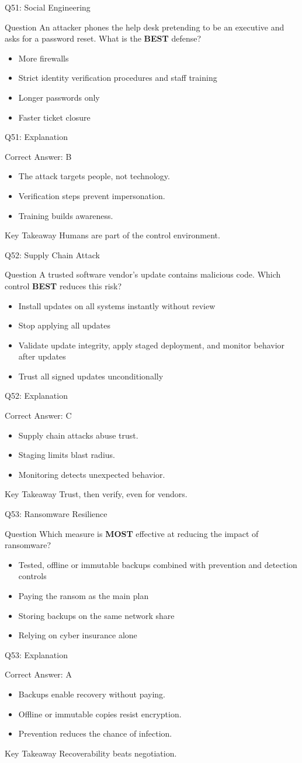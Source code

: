 \documentclass[aspectratio=169]{beamer}
\newcommand{\hq}[7]{%
	\begin{frame}{Q#1: #2}
		\begin{block}{Question}
			#3
		\end{block}
		\begin{itemize}
			#4
		\end{itemize}
	\end{frame}
	\begin{frame}{Q#1: Explanation}
		\begin{block}{Correct Answer: #5}
			\begin{itemize}
				#6
			\end{itemize}
		\end{block}
		\begin{alertblock}{Key Takeaway}
			#7
		\end{alertblock}
	\end{frame}
}
\begin{document}
	\hq{51}{Social Engineering}
	{An attacker phones the help desk pretending to be an executive and asks for a password reset. What is the \textbf{BEST} defense?}
	{\item[\textbf{(A)}] More firewalls
		\item[\textbf{(B)}] Strict identity verification procedures and staff training
		\item[\textbf{(C)}] Longer passwords only
		\item[\textbf{(D)}] Faster ticket closure}
	{B}
	{\item The attack targets people, not technology.
		\item Verification steps prevent impersonation.
		\item Training builds awareness.}
	{Humans are part of the control environment.}
	
	\hq{52}{Supply Chain Attack}
	{A trusted software vendor's update contains malicious code. Which control \textbf{BEST} reduces this risk?}
	{\item[\textbf{(A)}] Install updates on all systems instantly without review
		\item[\textbf{(B)}] Stop applying all updates
		\item[\textbf{(C)}] Validate update integrity, apply staged deployment, and monitor behavior after updates
		\item[\textbf{(D)}] Trust all signed updates unconditionally}
	{C}
	{\item Supply chain attacks abuse trust.
		\item Staging limits blast radius.
		\item Monitoring detects unexpected behavior.}
	{Trust, then verify, even for vendors.}
	
	\hq{53}{Ransomware Resilience}
	{Which measure is \textbf{MOST} effective at reducing the impact of ransomware?}
	{\item[\textbf{(A)}] Tested, offline or immutable backups combined with prevention and detection controls
		\item[\textbf{(B)}] Paying the ransom as the main plan
		\item[\textbf{(C)}] Storing backups on the same network share
		\item[\textbf{(D)}] Relying on cyber insurance alone}
	{A}
	{\item Backups enable recovery without paying.
		\item Offline or immutable copies resist encryption.
		\item Prevention reduces the chance of infection.}
	{Recoverability beats negotiation.}
	
\end{document}
